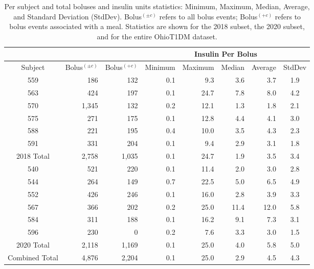 \begin{table}[t]\setlength{\tabcolsep}{4pt}
\begin{center}
\caption{Per subject and total boluses and insulin units statistics: Minimum, Maximum, Median, Average, and Standard Deviation (StdDev). Bolus$^{(\pm c)}$ refers to all bolus events; Bolus$^{(+c)}$ refers to bolus events associated with a meal. Statistics are shown for the 2018 subset, the 2020 subset, and for the entire OhioT1DM dataset.}
\label{tab:boluses}
\small
\begin{tabular}{|crr|rrrrc|}
    \cline{4-8}
    \multicolumn{3}{c|}{} & \multicolumn{5}{c|}{Insulin Per Bolus}\\
	\hline
	Subject & \multicolumn{1}{c}{Bolus$^{(\pm c)}$} & \multicolumn{1}{c|}{Bolus$^{(+c)}$}
	& \multicolumn{1}{c}{Minimum} & \multicolumn{1}{c}{Maximum} & \multicolumn{1}{c}{Median} & \multicolumn{1}{c}{Average} & StdDev\\
	\hline
	559 & 186 & 132 & 0.1 & 9.3 & 3.6 & 3.7 & 1.9\\
    563 & 424 & 197 & 0.1 & 24.7 & 7.8 & 8.0 & 4.2\\
    570 & 1,345 & 132 & 0.2 & 12.1 & 1.3 & 1.8 & 2.1\\
	575 & 271 & 175 & 0.1 & 12.8 & 4.4 & 4.1 & 3.0\\
	588 & 221 & 195 & 0.4 & 10.0 & 3.5 & 4.3 & 2.3\\
	591 & 331 & 204 & 0.1 & 9.4 & 2.9 & 3.1 & 1.8\\
	\hline
	2018 Total & 2,758 & 1,035 & 0.1 & 24.7 & 1.9 & 3.5 & 3.4\\
	\hline
	540 & 521 & 220 & 0.1 & 11.4 & 2.0 & 3.0 & 2.8\\
	544 & 264 & 149 & 0.7 & 22.5 & 5.0 & 6.5 & 4.9\\
	552 & 426 & 246 & 0.1 & 16.0 & 2.8 & 3.9 & 3.3\\
	567 & 366 & 202 & 0.2 & 25.0 & 11.4 & 12.0 & 5.8\\
	584 & 311 & 188 & 0.1 & 16.2 & 9.1 & 7.3 & 3.1\\
	596 & 230 & 0 & 0.2 & 7.6 & 3.3 & 3.0 & 1.5\\
	\hline
	2020 Total & 2,118 & 1,169 & 0.1 & 25.0 & 4.0 & 5.8 & 5.0\\
	\hline
	Combined Total & 4,876 & 2,204 & 0.1 & 25.0 & 2.9 & 4.5 & 4.3\\
	\hline
\end{tabular}
\end{center}
\end{table}

